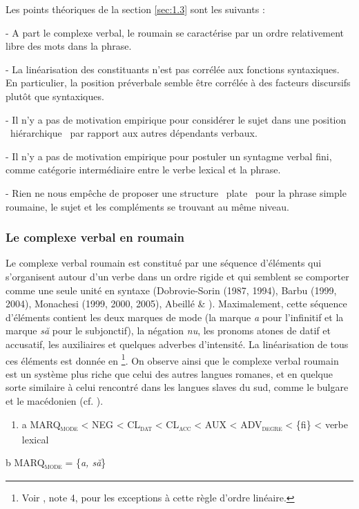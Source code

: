 Les points théoriques de la section \ref{sec:1.3} sont les suivants :

- A part le complexe verbal, le roumain se caractérise par un ordre relativement libre des mots dans la phrase.

- La linéarisation des constituants n'est pas corrélée aux fonctions syntaxiques. En particulier, la position préverbale semble être corrélée à des facteurs discursifs plutôt que syntaxiques. 

- Il n'y a pas de motivation empirique pour considérer le sujet dans une position {\guillemotleft}~hiérarchique~{\guillemotright} par rapport aux autres dépendants verbaux.

- Il n'y a pas de motivation empirique pour postuler un syntagme verbal fini, comme catégorie intermédiaire entre le verbe lexical et la phrase.

- Rien ne nous empêche de proposer une structure {\guillemotleft}~plate~{\guillemotright} pour la phrase simple roumaine, le sujet et les compléments se trouvant au même niveau.

\subsubsection{Le complexe verbal en roumain}
\label{bkm:Ref299309451}Le complexe verbal roumain est constitué par une séquence d'éléments qui s'organisent autour d'un verbe dans un ordre rigide et qui semblent se comporter comme une seule unité en syntaxe (Dobrovie-Sorin (1987, 1994), Barbu (1999, 2004), Monachesi (1999, 2000, 2005), Abeillé \& \citet{Godard2003}). Maximalement, cette séquence d'éléments contient les deux marques de mode (la marque \textit{a} pour l'infinitif et la marque \textit{să} pour le subjonctif), la négation \textit{nu}, les pronoms atones de datif et accusatif, les auxiliaires et quelques adverbes d'intensité. La linéarisation de tous ces éléments est donnée en \footnote{Voir \citet{Barbu1999}, note 4, pour les exceptions à cette règle d'ordre linéaire.}. On observe ainsi que le complexe verbal roumain est un système plus riche que celui des autres langues romanes, et en quelque sorte similaire à celui rencontré dans les langues slaves du sud, comme le bulgare et le macédonien (cf. \citet{Monachesi2005}). 


\begin{enumerate}
\item \label{bkm:Ref276915670}a  MARQ\textsc{\textsubscript{mode}} {\textless} NEG {\textless} CL\textsc{\textsubscript{dat}} {\textless} CL\textsc{\textsubscript{acc}} {\textless} AUX {\textless} ADV\textsc{\textsubscript{degre}} {\textless} \{fi\} {\textless} verbe lexical


\end{enumerate}
  b  MARQ\textsc{\textsubscript{mode}} = \{\textit{a, să}\}  


